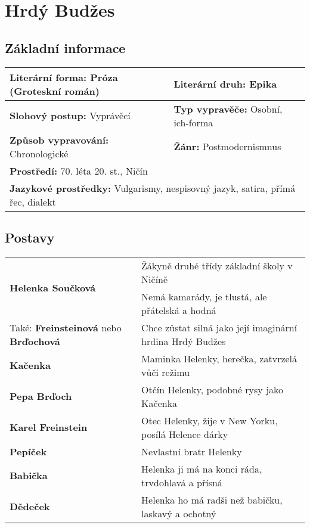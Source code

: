 \section{Hrdý Budžes}
\subsection*{Základní informace}
\begin{tabularx}{\linewidth}{l|l}
    \textbf{Literární forma:} Próza (Groteskní román) & \textbf{Literární druh:} Epika                         \\
    \hline
    \textbf{Slohový postup:} Vyprávěcí                & \textbf{Typ vypravěče:} Osobní, ich-forma              \\
    \hline
    \textbf{Způsob vypravování:} Chronologické        & \textbf{Žánr:} Postmodernismnus                        \\
    \hline
    \multicolumn{2}{l}{\textbf{Prostředí:} 70. léta 20. st., Ničín}                                            \\
    \hline
    \multicolumn{2}{l}{\textbf{Jazykové prostředky:} Vulgarismy, nespisovný jazyk, satira, přímá řec, dialekt} \\
\end{tabularx}
\subsection*{Postavy}
\begin{tabularx}{\linewidth}{l|l}
    \multirow{2}{15em}{\textbf{Helenka Součková}}        & Žákyně druhé třídy základní školy v Ničíně                \\
                                                         & Nemá kamarády, je tlustá, ale přátelská a hodná           \\
    Také: \textbf{Freinsteinová} nebo \textbf{Brďochová} & Chce zůstat silná jako její imaginární hrdina Hrdý Budžes \\
    \hline
    \textbf{Kačenka}                                     & Maminka Helenky, herečka, zatvrzelá vůči režimu           \\
    \hline
    \textbf{Pepa Brďoch}                                 & Otčín Helenky, podobné rysy jako Kačenka                  \\
    \hline
    \textbf{Karel Freinstein}                            & Otec Helenky, žije v New Yorku, posílá Helence dárky      \\
    \hline
    \textbf{Pepíček}                                     & Nevlastní bratr Helenky                                   \\
    \hline
    \textbf{Babička}                                     & Helenka ji má na konci ráda, trvdohlavá a přísná          \\
    \hline
    \textbf{Dědeček}                                     & Helenka ho má radši než babičku, laskavý a ochotný        \\
\end{tabularx}
